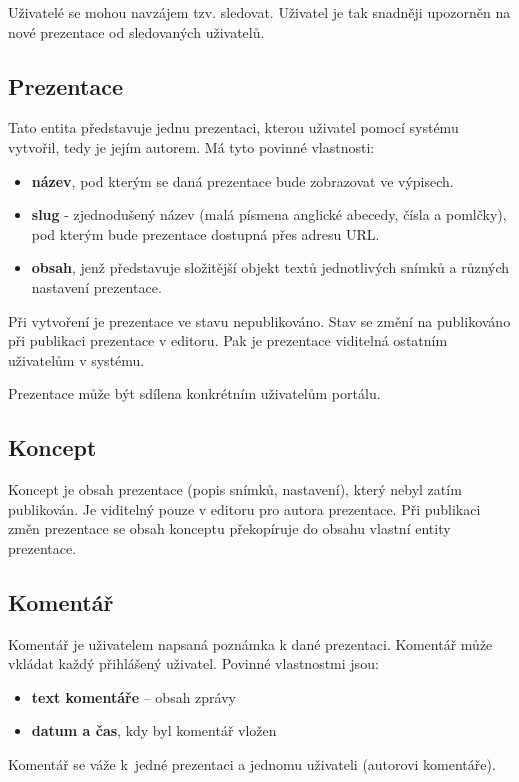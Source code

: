 \documentclass[11pt,twoside,a4paper]{book}
\begin{document}
Uživatelé se mohou navzájem tzv. sledovat. Uživatel je tak snadněji upozorněn na nové prezentace od sledovaných uživatelů.

\subsection{Prezentace}
Tato entita představuje jednu prezentaci, kterou uživatel pomocí systému vytvořil, tedy je jejím autorem. Má tyto povinné
vlastnosti:

\begin{itemize}
	\item \textbf{název}, pod kterým se daná prezentace bude zobrazovat ve výpisech.
	\item \textbf{slug} - zjednodušený název (malá písmena anglické abecedy, čísla a pomlčky), pod kterým bude prezentace dostupná přes adresu URL.
	\item \textbf{obsah}, jenž představuje složitější objekt textů jednotlivých snímků a různých nastavení prezentace.
\end{itemize}

Při vytvoření je prezentace ve stavu nepublikováno. Stav se změní na publikováno při publikaci prezentace v editoru. Pak je prezentace viditelná ostatním uživatelům v systému.

Prezentace může být sdílena konkrétním uživatelům portálu.


\subsection{Koncept}
Koncept je obsah prezentace (popis snímků, nastavení), který nebyl zatím publikován. Je viditelný pouze v editoru pro autora prezentace. Při publikaci změn prezentace se obsah konceptu překopíruje do obsahu vlastní entity prezentace.


\subsection{Komentář}
Komentář je uživatelem napsaná poznámka k dané prezentaci. Komentář může vkládat každý přihlášený uživatel. Povinné
vlastnostmi jsou:

\begin{itemize}
	\item \textbf{text komentáře} – obsah zprávy
	\item \textbf{datum a čas}, kdy byl komentář vložen
\end{itemize}

Komentář se váže k~jedné prezentaci a jednomu uživateli (autorovi komentáře).
\end{document}
